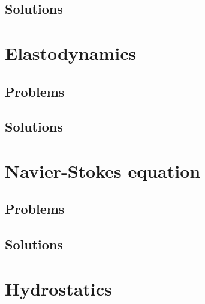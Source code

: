    \section{Solutions}
      \shipoutAnswer

\chapter{Elastodynamics}
   
   
   
   
   \section{Problems}
      
   \section{Solutions}
      \shipoutAnswer

\chapter{Navier-Stokes equation}
   
   
   
   
   
   

   \section{Problems}
      
      
      
      
      
      
      
      
   \section{Solutions}
      \shipoutAnswer

\chapter{Hydrostatics}
   
